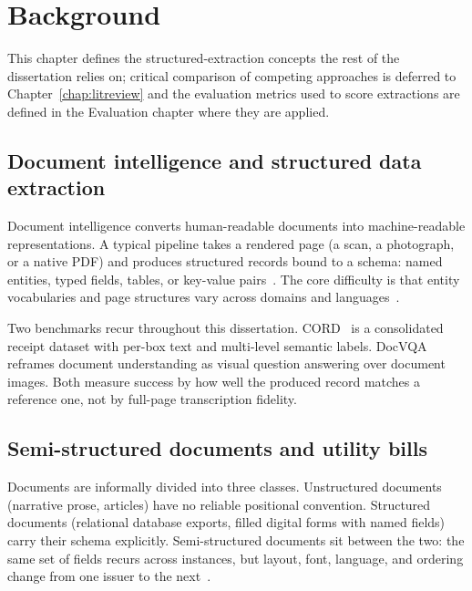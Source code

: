 
\chapter{Background}
\label{chap:background}

This chapter defines the structured-extraction concepts the rest of
the dissertation relies on; critical comparison of competing
approaches is deferred to Chapter~\ref{chap:litreview} and the
evaluation metrics used to score extractions are defined in the
Evaluation chapter where they are applied.

\section{Document intelligence and structured data extraction}
\label{sec:bg-docintel}

Document intelligence converts human-readable documents into
machine-readable representations. A typical pipeline takes a rendered
page (a scan, a photograph, or a native PDF) and produces structured
records bound to a schema: named entities, typed fields, tables, or
key-value pairs~\cite{cui2021documentai}. The core difficulty is that
entity vocabularies and page structures vary across domains and
languages~\cite{silva2021review}.

Two benchmarks recur throughout this dissertation.
CORD~\cite{park2019cord} is a consolidated receipt dataset with
per-box text and multi-level semantic labels.
DocVQA~\cite{mathew2021docvqa} reframes document understanding as
visual question answering over document images. Both measure success
by how well the produced record matches a reference one, not by
full-page transcription fidelity.

\section{Semi-structured documents and utility bills}
\label{sec:bg-semistructured}

Documents are informally divided into three classes. Unstructured
documents (narrative prose, articles) have no reliable positional
convention. Structured documents (relational database exports, filled
digital forms with named fields) carry their schema explicitly.
Semi-structured documents sit between the two: the same set of fields
recurs across instances, but layout, font, language, and ordering
change from one issuer to the next~\cite{abiteboul1997querying}.

